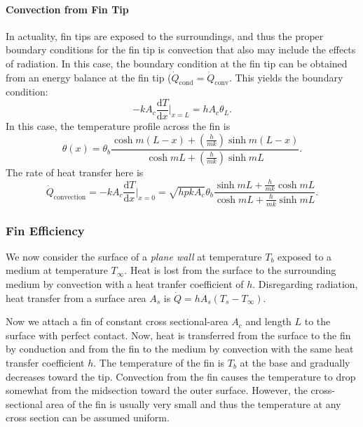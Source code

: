 \paragraph{Convection from Fin Tip}
In actuality, fin tips are exposed to the surroundings, and thus the proper boundary conditions for the fin tip is convection that also may include the effects of radiation.
In this case, the boundary condition at the fin tip can be obtained from an energy balance at the fin tip ($\dot{Q}_{\text{cond}} = \dot{Q}_{\text{conv}}$.
This yields the boundary condition:
\begin{equation*}
  - k A_c \frac{\mathrm{d}T}{\mathrm{d}x} \bigg|_{x = L} = h A_c \theta_L
.\end{equation*}
In this case, the temperature profile across the fin is
\begin{equation*}
  \theta(x) = \theta_b \frac{\cosh m (L-x) + \left( \frac{h}{m k} \right) \sinh m (L-x)}{\cosh m L + \left( \frac{h}{m k} \right) \sinh m L}
.\end{equation*}
The rate of heat transfer here is
\begin{equation*}
\dot{Q}_{\text{convection}} = - k A_c \frac{\mathrm{d}T}{\mathrm{d}x} \bigg|_{x = 0} = \sqrt{h p k A_c } \theta_b \frac{\sinh m L + \frac{h}{m k} \cosh m L}{\cosh m L + \frac{h}{m k} \sinh m L}
.\end{equation*}

\subsubsection{Fin Efficiency}
We now consider the surface of a \textit{plane wall} at temperature $T_b$ exposed to a medium at temperature $T_{\infty}$.
Heat is lost from the surface to the surrounding medium by convection with a heat tranfer coefficient of $h$.
Disregarding radiation, heat transfer from a surface area $A_s$ is $\dot{Q} = h A_s (T_s - T_{\infty})$.

Now we attach a fin of constant cross sectional-area $A_c$ and length $L$ to the surface with perfect contact.
Now, heat is transferred from the surface to the fin by conduction and from the fin to the medium by convection with the same heat transfer coefficient $h$.
The temperature of the fin is $T_b$ at the base and gradually decreases toward the tip.
Convection from the fin causes the temperature to drop somewhat from the midsection toward the outer surface.
However, the cross-sectional area of the fin is usually very small and thus the temperature at any cross section can be assumed uniform.

